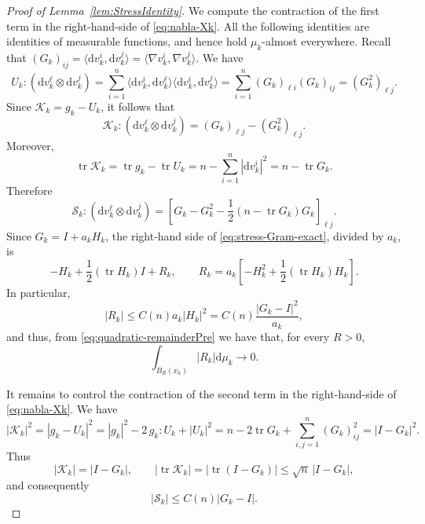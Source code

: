 \documentclass[12pt,a4paper,reqno]{amsart}
\renewcommand{\leq}{\leqslant}
\newcommand{\tr}{\operatorname{tr}}
\begin{document}
\begin{proof}[Proof of Lemma~\ref{lem:StressIdentity}]
We compute the contraction of the first term in the right-hand-side of \eqref{eq:nabla-Xk}.  All the following identities are
identities of measurable functions, and hence hold $\mu_k$-almost
everywhere.  Recall that
$
 (G_k)_{ij}
 =\langle \mathrm{d}v_k^i,\mathrm{d}v_k^j\rangle
 =\langle\nabla v_k^i,\nabla v_k^j\rangle$. 
We have
\[
 U_k:(\mathrm{d}v_k^\ell\otimes \mathrm{d}v_k^j)
 =\sum_{i=1}^n
   \langle \mathrm{d}v_k^i,\mathrm{d}v_k^\ell\rangle
   \langle \mathrm{d}v_k^i,\mathrm{d}v_k^j\rangle
 =\sum_{i=1}^n(G_k)_{\ell i}(G_k)_{ij}
   =(G_k^2)_{\ell j}.
\]
Since
$\mathcal K_k=g_k-U_k$, it follows that
\[
 \mathcal K_k:(\mathrm{d}v_k^\ell\otimes \mathrm{d}v_k^j)
 =(G_k)_{\ell j}-(G_k^2)_{\ell j}.
\]
Moreover,
\[
 \tr\mathcal K_k
 =\tr g_k-\tr U_k
 =n-\sum_{i=1}^n|\mathrm{d}v_k^i|^2
 =n-\tr G_k.
\]
Therefore
\begin{equation}
 \mathcal S_k:(\mathrm{d}v_k^\ell\otimes \mathrm{d}v_k^j)
 =\left[G_k-G_k^2-\frac12
       (n-\tr G_k)G_k\right]_{\ell j}.
 \label{eq:stress-Gram-exact}
\end{equation}
Since $G_k=I+a_kH_k$, the right-hand side of
\eqref{eq:stress-Gram-exact}, divided by $a_k$,
is
\begin{equation}
 -H_k+\frac12(\operatorname{tr}H_k)I+R_k,
 \qquad
 R_k=a_k\left[-H_k^2+\frac12
       (\operatorname{tr}H_k)H_k\right].
 \label{eq:stress-expansion}
\end{equation}
In particular,
\begin{equation}\label{eq:stress-remainder}
 |R_k|\leq C(n)a_k|H_k|^2
 =C(n)\frac{|G_k-I|^2}{a_k},
\end{equation}
and thus, from \eqref{eq:quadratic-remainderPre} we have that, for every $R>0$,
\begin{equation}\label{eq:stress-remainderIntegral}
 \int_{B_R(x_k)}|R_k|\mathrm{d}\mu_k\to 0.
\end{equation}

It remains to control the contraction of the second term in the right-hand-side of \eqref{eq:nabla-Xk}.
We have
\[
 |\mathcal K_k|^2
 =|g_k-U_k|^2
 =|g_k|^2-2\,g_k:U_k+|U_k|^2
 =n-2\tr G_k+\sum_{i,j=1}^n(G_k)_{ij}^2
 =|I-G_k|^2.
\]
Thus
\[
 |\mathcal K_k|=|I-G_k|,
 \qquad
 |\tr\mathcal K_k|
 =|\tr(I-G_k)|
 \leq\sqrt n\,|I-G_k|,
\]
and consequently
\begin{equation}\label{eq:S-Gram-bound}
 |\mathcal S_k|\leq C(n)|G_k-I|.
\end{equation}


\end{proof}
\end{document}
